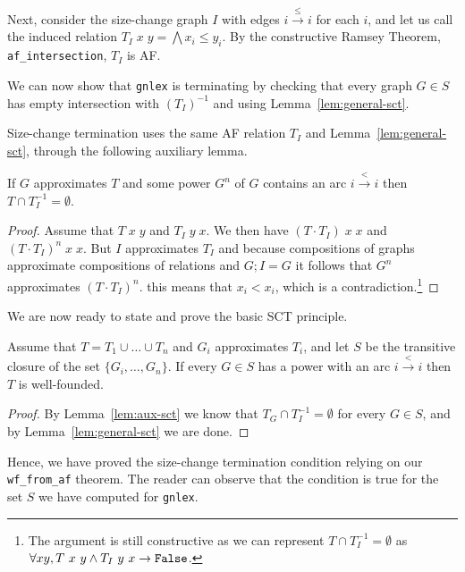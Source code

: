 \documentclass{llncs}
\begin{document}
Next, consider the size-change graph $I$ with 
edges $i \stackrel{\leq}{\longrightarrow} i$ for each $i$, and let us call the induced relation 
$T_I\;x\;y = \bigwedge x_i \leq y_i$. By the constructive Ramsey Theorem, \lstinline|af_intersection|, $T_I$ is AF.

\vspace{5pt}\begin{example}
We can now show that \lstinline|gnlex| is terminating by checking that 
every graph $G \in S$ has empty intersection with $(T_I)^{-1}$ and using 
Lemma~\ref{lem:general-sct}.
\end{example}

Size-change termination uses the same AF relation $T_I$ and Lemma~\ref{lem:general-sct}, 
through the following auxiliary lemma. 

\vspace{5pt}\begin{lemma}\label{lem:aux-sct}
If $G$ approximates $T$ and some power $G^n$ of $G$ contains an arc $i \stackrel{<}{\longrightarrow} i$ 
then $T \cap T_I^{-1} = \emptyset$. 
\end{lemma}
\begin{proof} Assume that $T\;x\;y$ and $T_I\;y\;x$. We then have 
$(T{\cdot}T_I)\;x\;x$ and $(T{\cdot}T_I)^n\;x\;x$. But $I$ approximates $T_I$ and because compositions
of graphs approximate compositions of relations and $G;I = G$ it follows 
that $G^n$ approximates $(T{\cdot}T_I)^n$. this means that $x_i < x_i$, which is a 
contradiction.\footnote{The argument is still constructive as we can represent 
$T \cap T_I^{-1} = \emptyset$ as $\forall x y, T~x~y \land T_I~y~x \to {\tt False}$.}
\end{proof}
We are now ready to state and prove the basic SCT principle. 
\vspace{5pt}\begin{theorem}
Assume that $T = T_1\cup\ldots\cup T_n$ and $G_i$ approximates $T_i$, and let $S$ be the transitive 
closure of the set $\{G_i,\ldots,G_n\}$. If every $G \in S$ has a power with an 
arc $i \stackrel{<}{\longrightarrow} i$ then $T$ is well-founded. 
\end{theorem}
\begin{proof}
By Lemma~\ref{lem:aux-sct} we know that $T_G \cap T_I^{-1} = \emptyset$ for every $G \in S$, and 
by Lemma~\ref{lem:general-sct} we are done. 
\end{proof}
Hence, we have proved the size-change termination condition relying on our 
\lstinline|wf_from_af| theorem. The reader can observe that the condition is true 
for the set $S$ we have computed for \lstinline|gnlex|. 
\end{document}
